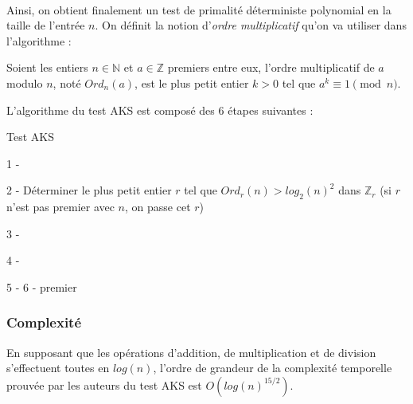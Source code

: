 		\paragraph{}Ainsi, on obtient finalement un test de primalité déterministe polynomial en la taille de l'entrée $n$. On définit la notion d'\textit{ordre multiplicatif} qu'on va utiliser dans l'algorithme :
				
		\vspace{-1.5em}\begin{adjustwidth}{1.5cm}{1.5cm} 
		\begin{Def}
			\label{OrdM}
			Soient les entiers $n \in \mathbb{N}$ et $a \in \mathbb{Z}$ premiers entre eux, l'ordre multiplicatif de $a$ modulo $n$, noté $Ord_{n}(a)$, est le plus petit entier $k > 0$ tel que $a^{k} \equiv 1 \pmod n$.
		\end{Def}
		\end{adjustwidth}\vspace{0.5em}
		
		L'algorithme du test AKS est composé des 6 étapes suivantes :\\
		
		\begin{algorithm}[H]
			\caption{Test AKS}\label{AKS}
			
			1 - 
			
            2 - Déterminer le plus petit entier $r$ tel que $Ord_{r}(n) > log_{2}(n)^{2}$ dans $\mathbb{Z}_{r}$ (si $r$ n'est pas premier avec $n$, on passe cet $r$)\;
			
            3 - 
            
            4 - 
            
            5 - 
			6 - \Retour premier\;
		\end{algorithm}
		
	\subsubsection{Complexité}
		En supposant que les opérations d'addition, de multiplication et de division s'effectuent toutes en $log(n)$, l'ordre de grandeur de la complexité temporelle prouvée par les auteurs du test AKS est $O(log(n)^{15/2})$.
